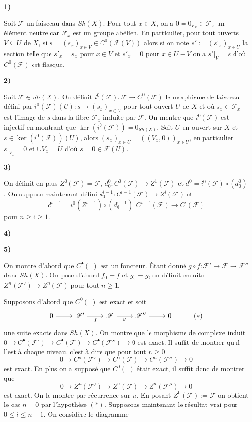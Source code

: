 \documentclass[a4paper,12pt]{article}
\newcommand{\F}{\mathscr F}
\theoremstyle{plain}
\theoremstyle{definition}
\theoremstyle{remark}
\begin{document}
\begin{center}
	\textbf{1)}
\end{center}
Soit $\F$ un faisceau dans $Sh(X)$. Pour tout $x\in X$, on a 
$0=0_{F_x}\in \F_x$ un élément neutre car
$\F_x$ est un groupe abélien. En particulier, pour tout ouverts 
$V\subseteq U$ de $X$, si $s=(s_x)_{x\in V}\in C^0(\F(V))$ alors
si on note $s':=(s'_x)_{x\in U}$ la section telle que $s'_x=s_x$ pour
$x\in V$ et $s'_x=0$ pour $x\in U-V$ on a $s'|_V=s$ d'où $C^0(\F)$
est flasque.

\begin{center}
	\textbf{2)}
\end{center}
Soit $\F\in Sh(X)$. On définit $i^0(\F)\colon \F\to C^0(\F)$ le
morphisme de faisceau défini par 
$i^0(\F)(U)\colon s\mapsto (s_x)_{x\in U}$ pour tout ouvert $U$ de $X$
et où $s_x\in \F_x$ est 
l'image de $s$ dans la fibre $\F_x$ induite par $\F$. On montre que
$i^0(\F)$ est injectif en montrant que $\ker(i^0(\F))=0_{Sh(X)}$. 
Soit $U$ un ouvert sur $X$ et $s\in \ker(i^0(\F))(U)$, alors 
$(s_x)_{x\in U}=((V_x, 0))_{x\in U}$, en particulier $s|_{V_x}=0$ 
et $\cup V_x = U$ d'où $s=0\in \F(U)$.

\begin{center}
	\textbf{3)}
\end{center}
On définit en plus $Z^0(\F)=\F$, $d_0^0\colon C^0(\F)\to Z^1(\F)$
et $d^0=i^0(\F)\circ(d_0^0)$. On suppose maintenant défini
$d_0^{i-1}\colon C^{i-1}(\F) \to Z^i(\F)$ et 
\[d^{i-1}=i^0(Z^{i-1})\circ(d_0^{i-1})\colon C^{i-1}(\F)\to C^i(\F)\]
pour $n\geq i\geq 1$. 

\begin{center}
	\textbf{4)}
\end{center}

\begin{center}
	\textbf{5)}
\end{center}
On montre d'abord que $C^\bullet(\_)$ est un foncteur. Étant donné
$g\circ f \colon \F'\to \F\to \F'' $ dans $Sh(X)$. On pose d'abord
$f_0=f$ et $g_0=g$, on définit ensuite $Z^n(\F')\to Z^n(\F)$ pour tout
$n\geq 1$.

Supposons d'abord que $C^0(\_)$ est exact et soit 
\[\begin{tikzcd}
	0 & {\F'} & \F & {\F''} & 0 & {(*)}
	\arrow[from=1-1, to=1-2]
	\arrow["f"', from=1-2, to=1-3]
	\arrow["g"', from=1-3, to=1-4]
	\arrow[from=1-4, to=1-5]
\end{tikzcd}\]
une suite exacte dans $Sh(X)$. On montre que le morphisme de complexe
induit $0\to C^\bullet(\F')\to C^\bullet(\F)\to C^\bullet(\F'')\to 0$
est exact. Il suffit de montrer qu'il l'est à chaque niveau, c'est à
dire que pour tout $n\geq 0$ 
\[0\to C^n(\F')\to C^n(\F)\to C^n(\F'')\to 0\]
est exact. En plus on a supposé que $C^0(\_)$ était exact, il suffit
donc de montrer que 
\[0\to Z^n(\F')\to Z^n(\F)\to Z^n(\F'')\to 0\]
est exact. On le montre par récurrence sur $n$. En posant $Z^0(\F):=\F$
on obtient le cas $n=0$ par l'hypothèse $(*)$. Supposons 
maintenant le résultat vrai pour $0\leq i\leq n-1$.
On considère le diagramme 
\end{document}
